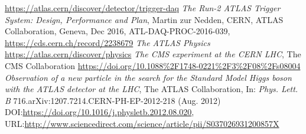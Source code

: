 \documentclass[a4paper, oneside, 11pt, openright]{book}
\begin{document}
\begin{thebibliography}{32}
			\url{https://atlas.cern/discover/detector/trigger-daq}	
			\textit{The Run-2 ATLAS Trigger System: Design, Performance and
			Plan}, Martin zur Nedden, CERN, ATLAS Collaboration, Geneva, Dec 2016, ATL-DAQ-PROC-2016-039,
			\url{https://cds.cern.ch/record/2238679}
			\textit{The ATLAS Physics}
			\url{https://atlas.cern/discover/physics}
			\textit{The CMS experiment at the CERN LHC}, The CMS Collaboration
			\url{https://doi.org/10.1088%2F1748-0221%2F3%2F08%2Fs08004}
			\textit{Observation of a new particle in the search for the Standard Model Higgs boson with the ATLAS detector at the LHC},
			The ATLAS Collaboration, In: \textit{Phys. Lett. B} 716.arXiv:1207.7214.CERN-PH-EP-2012-218 (Aug. 2012) DOI:\url{https://doi.org/10.1016/j.physletb.2012.08.020}, URL:\url{http://www.sciencedirect.com/science/article/pii/S037026931200857X}
		 	

\end{thebibliography}
\end{document}
